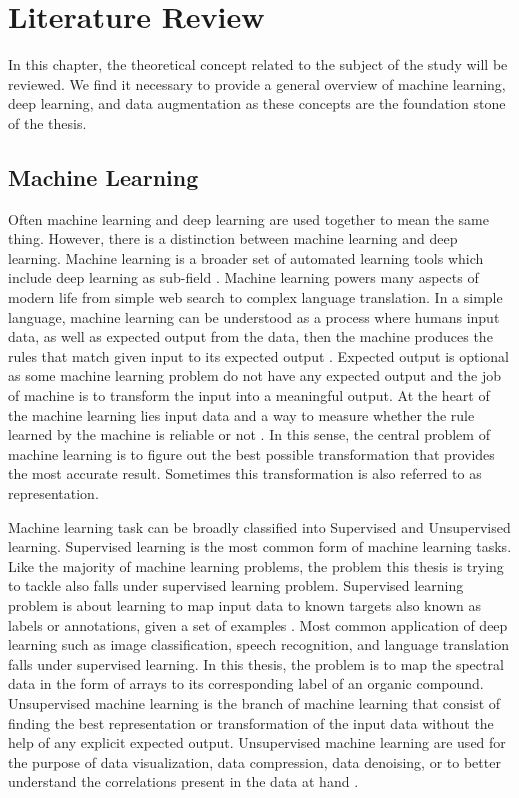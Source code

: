 \chapter{Literature Review}
\label{chapter:background} 

In this chapter, the theoretical concept related to the subject of the study will be reviewed. We find it necessary to provide a general overview of machine learning, deep learning, and data augmentation as these concepts are the foundation stone of the thesis.


\section{Machine Learning}

Often machine learning and deep learning are used together to mean the same thing. However, there is a distinction between machine learning and deep learning. Machine learning is a broader set of automated learning tools which include deep learning as sub-field \citep{chollet2017deep}. Machine learning powers many aspects of modern life from simple web search to complex language translation. In a simple language, machine learning can be understood as a process where humans input data, as well as expected output from the data, then the machine produces the rules that match given input to its expected output \citep{chollet2017deep}. Expected output is optional as some machine learning problem do not have any expected output and the job of machine is to transform the input into a meaningful output. At the heart of the machine learning lies input data and a way to measure whether the rule learned by the machine is reliable or not \citep{chollet2017deep}. In this sense, the central problem of machine learning is to figure out the best possible transformation that provides the most accurate result. Sometimes this transformation is also referred to as representation. 

Machine learning task can be broadly classified into Supervised and Unsupervised learning. Supervised learning is the most common form of machine learning tasks. Like the majority of machine learning problems, the problem this thesis is trying to tackle also falls under supervised learning problem. Supervised learning problem is about learning to map input data to known targets also known as labels or annotations, given a set of examples \citep{chollet2017deep}. Most common application of deep learning such as image classification, speech recognition, and language translation falls under supervised learning. In this thesis, the problem is to map the spectral data in the form of arrays to its corresponding label of an organic compound. Unsupervised machine learning is the branch of machine learning that consist of finding the best representation or transformation of the input data without the help of any explicit expected output. Unsupervised machine learning are used for the purpose of data visualization, data compression, data denoising, or to better understand the correlations present in the data at hand \citep{chollet2015keras}.

